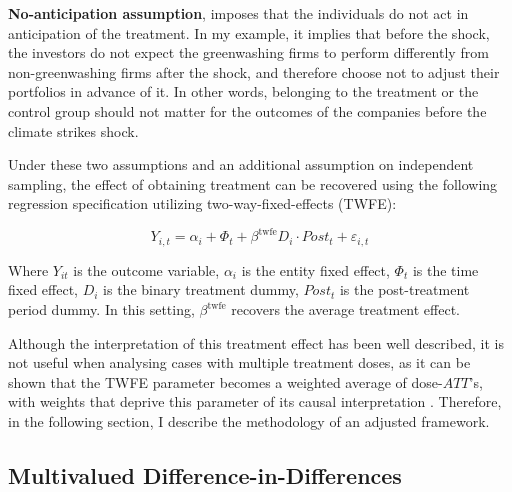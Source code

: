 \documentclass[12pt]{article}
\begin{document}
\textbf{No-anticipation assumption}, imposes that the individuals do not act in anticipation of the treatment. In my example, it implies that before the shock, the investors do not expect the greenwashing firms to perform differently from non-greenwashing firms after the shock, and therefore choose not to adjust their portfolios in advance of it. In other words, belonging to the treatment or the control group should not matter for the outcomes of the companies before the climate strikes shock.

Under these two assumptions and an additional assumption on independent sampling, the effect of obtaining treatment can be recovered using the following regression specification utilizing two-way-fixed-effects (TWFE):

\begin{equation}
    Y_{i,t} = \alpha_i + \Phi_t + \beta^{\text{twfe}} D_{i} \cdot Post_{t} + \varepsilon_{i,t}
\end{equation}

Where $Y_{it}$ is the outcome variable, $\alpha_i$ is the entity fixed effect, $\Phi_t$ is the time fixed effect, $D_i$ is the binary treatment dummy, $Post_t$ is the post-treatment period dummy. In this setting, $\beta^{\text{twfe}}$ recovers the average treatment effect.

Although the interpretation of this treatment effect has been well described, it is not useful when analysing cases with multiple treatment doses, as it can be shown that the TWFE parameter becomes a weighted average of dose-$ATT$'s, with weights that deprive this parameter of its causal interpretation \parencite{callawayDifferenceinDifferencesContinuousTreatment2025}. Therefore, in the following section, I describe the methodology of an adjusted framework.

\subsection{Multivalued Difference-in-Differences}
\end{document}

